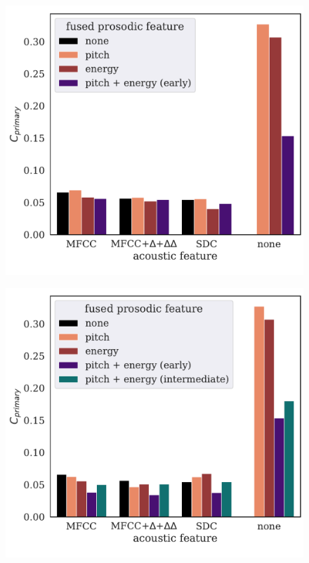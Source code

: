 \documentclass[bsc,frontabs,twoside,singlespacing,parskip,deptreport]{infthesis}
\begin{document}
{  \begin{figure}[h!]
    \centering
    \begin{minipage}{0.49\textwidth}
      \centering
      \includegraphics[width=\textwidth]{../img/summary-early-10s.pdf}
      \label{fig:summary-early-10s}
    \end{minipage}
    \begin{minipage}{0.49\textwidth}
      \centering
      \includegraphics[width=\textwidth]{../img/summary-intermediate-10s.pdf}

\end{minipage}
\end{figure}}
\end{document}
